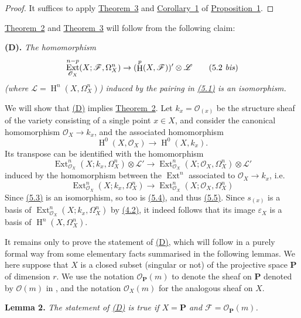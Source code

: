 \documentclass{article}
\newenvironment{itenv}[1]
  {\phantomsection\par\medskip\noindent\textbf{#1.}\itshape}
  {\par\medskip}
\newcommand{\scr}[1]{{\mathscr{#1}}}
\newcommand{\bb}{\mathbf}
\DeclareMathOperator{\Ext}{Ext}
\DeclareMathOperator{\HH}{H}
\newcommand{\oldpage}[1]{\marginpar{\footnotesize$\Big\vert$ \textit{p.~#1}}}
\begin{document}
\begin{proof}
  It suffices to apply \hyperref[theorem3]{Theorem~3} and \hyperref[proposition1corollary1]{Corollary~1} of \hyperref[proposition1]{Proposition~1}.
\end{proof}

\hyperref[theorem2]{Theorem~2} and \hyperref[theorem3]{Theorem~3} will follow from the following claim:

\begin{itenv}{(D)}
\label{(D)}
  The homomorphism
  \[
  \label{5.2bis}
    \Ext_{\scr{O}_X}^{n-p}(X;\scr{F},\Omega_X^n) \to (\HH^p(X,\scr{F}))'\otimes\scr{L}
  \tag{5.2 \emph{bis}}
  \]
  (where $\scr{L}=\HH^n(X,\Omega_X^n)$) induced by the pairing in \hyperref[5.1]{(5.1)} is an isomorphism.
\end{itenv}

We will show that \hyperref[(D)]{(D)} implies \hyperref[theorem2]{Theorem~2}.
Let $k_x=\scr{O}_{(x)}$ be the structure sheaf of the variety consisting of a single point $x\in X$, and consider the canonical homomorphism $\scr{O}_X\to k_x$, and the associated homomorphism
\[
\label{5.3}
  \HH^0(X,\scr{O}_X) \to \HH^0(X,k_x).
\tag{5.3}
\]
Its transpose can be identified with the homomorphism
\[
\label{5.4}
  \Ext_{\scr{O}_X}^n(X;k_x,\Omega_X^n)\otimes\scr{L}' \to \Ext_{\scr{O}_X}^n(X;\scr{O}_X,\Omega_X^n)\otimes\scr{L}'
\tag{5.4}
\]
induced by the homomorphism between the $\Ext^n$ associated to $\scr{O}_X\to k_x$, i.e.
\[
\label{5.5}
  \Ext_{\scr{O}_X}^n(X;k_x,\Omega_X^n) \to \Ext_{\scr{O}_X}^n(X;\scr{O}_X,\Omega_X^n)
\tag{5.5}
\]
\oldpage{149-15}
Since \hyperref[5.3]{(5.3)} is an isomorphism, so too is \hyperref[5.4]{(5.4)}, and thus \hyperref[5.5]{(5.5)}.
Since $s_{(x)}$ is a basis of $\Ext_{\scr{O}_X}^n(X;k_x,\Omega_X^n)$ by \hyperref[4.2]{(4.2)}, it indeed follows that its image $\varepsilon_X$ is a basis of $\HH^n(X,\Omega_X^n)$.

It remains only to prove the statement of \hyperref[(D)]{(D)}, which will follow in a purely formal way from some elementary facts summarised in the following lemmas.
We here suppose that $X$ is a closed subset (singular or not) of the projective space $\bb{P}$ of dimension $r$.
We use the notation $\scr{O}_\bb{P}(m)$ to denote the sheaf on $\bb{P}$ denoted by $\scr{O}(m)$ in \cite{3}, and the notation $\scr{O}_X(m)$ for the analogous sheaf on $X$.

\begin{itenv}{Lemma 2}
\label{lemma2}
  The statement of \hyperref[(D)]{(D)} is true if $X=\bb{P}$ and $\scr{F}=\scr{O}_\bb{P}(m)$.
\end{itenv}
\end{document}
